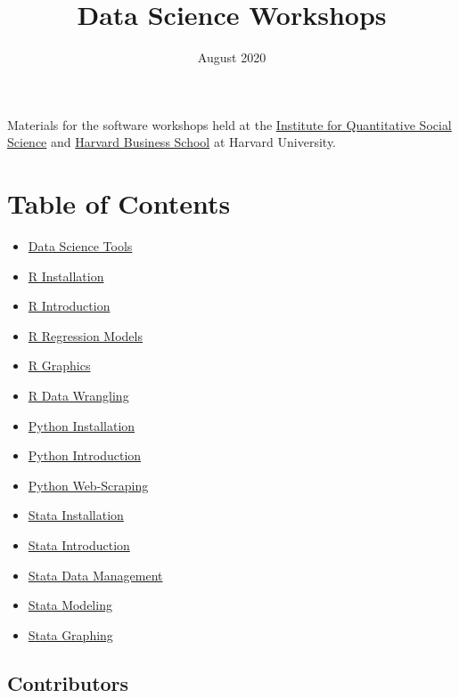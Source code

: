 \documentclass[
]{book}
\title{Data Science Workshops}
\author{}
\date{\vspace{-2.5em}August 2020}
\providecommand{\tightlist}{%
  \setlength{\itemsep}{0pt}\setlength{\parskip}{0pt}}
\begin{document}
\maketitle

{
\setcounter{tocdepth}{1}
\tableofcontents
}
Materials for the software workshops held at the \href{http://dss.iq.harvard.edu/}{Institute for Quantitative Social Science} and \href{https://training.rcs.hbs.org}{Harvard Business School} at Harvard University.

\hypertarget{table-of-contents}{%
\chapter*{Table of Contents}\label{table-of-contents}}

\begin{itemize}
\tightlist
\item
  \href{./DataScienceTools.html}{Data Science Tools}
\item
  \href{./Rinstall.html}{R Installation}
\item
  \href{./Rintro.html}{R Introduction}
\item
  \href{./Rmodels.html}{R Regression Models}
\item
  \href{./Rgraphics.html}{R Graphics}
\item
  \href{./RDataWrangling.html}{R Data Wrangling}
\item
  \href{./PythonInstall.html}{Python Installation}
\item
  \href{./PythonIntro.html}{Python Introduction}
\item
  \href{./PythonWebScrape.html}{Python Web-Scraping}
\item
  \href{./StataInstall.html}{Stata Installation}
\item
  \href{./StataIntro.html}{Stata Introduction}
\item
  \href{./StataDatMan.html}{Stata Data Management}
\item
  \href{./StataMod.html}{Stata Modeling}
\item
  \href{./StataGraph.html}{Stata Graphing}
\end{itemize}

\hypertarget{contributors}{%
\section*{Contributors}\label{contributors}}
\end{document}
